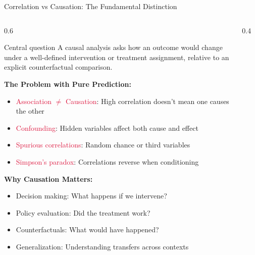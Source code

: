 \documentclass[aspectratio=169,11pt]{beamer}
\begin{document}
\begin{frame}{Correlation vs Causation: The Fundamental Distinction}
\begin{columns}
\begin{column}{0.6\textwidth}
\begin{block}{Central question}
A causal analysis asks how an outcome would change under a well-defined intervention or treatment assignment, relative to an explicit counterfactual comparison.
\end{block}

\vspace{0.3cm}
\textbf{The Problem with Pure Prediction:}
\begin{itemize}
\item \textcolor{crimson}{Association $\neq$ Causation}: High correlation doesn't mean one causes the other
\item \textcolor{crimson}{Confounding}: Hidden variables affect both cause and effect
\item \textcolor{crimson}{Spurious correlations}: Random chance or third variables
\item \textcolor{crimson}{Simpson's paradox}: Correlations reverse when conditioning
\end{itemize}

\vspace{0.3cm}
\textbf{Why Causation Matters:}
\begin{itemize}
\item \textcolor{forest}{Decision making}: What happens if we intervene?
\item \textcolor{forest}{Policy evaluation}: Did the treatment work?
\item \textcolor{forest}{Counterfactuals}: What would have happened?
\item \textcolor{forest}{Generalization}: Understanding transfers across contexts
\end{itemize}
\end{column}
\begin{column}{0.4\textwidth}
\begin{figure}
\centering
{}
\end{figure}
\end{column}
\end{columns}
\end{frame}
\end{document}
